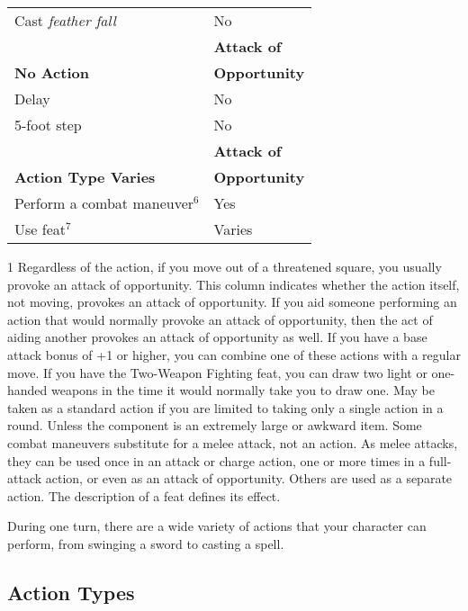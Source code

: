 \begin{table}[]
\begin{tabular}{ll}
Cast \textit{feather fall} & No\\
                         & \textbf{Attack of}\\
\textbf{No Action} &  \textbf{Opportunity}\\
Delay & No\\
5-foot step & No\\
                         & \textbf{Attack of}\\
\textbf{Action Type Varies} & \textbf{Opportunity}\\
Perform a combat maneuver\(^{6}\) & Yes\\
Use feat\(^{7}\) & Varies\\
\end{tabular}
1 Regardless of the action, if you move out of a threatened square, you usually provoke an attack of opportunity. This column indicates whether the action itself, not moving, provokes an attack of opportunity. If you aid someone performing an action that would normally provoke an attack of opportunity, then the act of aiding another provokes an attack of opportunity as well. If you have a base attack bonus of +1 or higher, you can combine one of these actions with a regular move. If you have the Two-Weapon Fighting feat, you can draw two light or one-handed weapons in the time it would normally take you to draw one. May be taken as a standard action if you are limited to taking only a single action in a round. Unless the component is an extremely large or awkward item. Some combat maneuvers substitute for a melee attack, not an action. As melee attacks, they can be used once in an attack or charge action, one or more times in a full-attack action, or even as an attack of opportunity. Others are used as a separate action. The description of a feat defines its effect.
\end{table}

				
During one turn, there are a wide variety of actions that your character can perform, from swinging a sword to casting a spell.
				
\subsection{Action Types}

